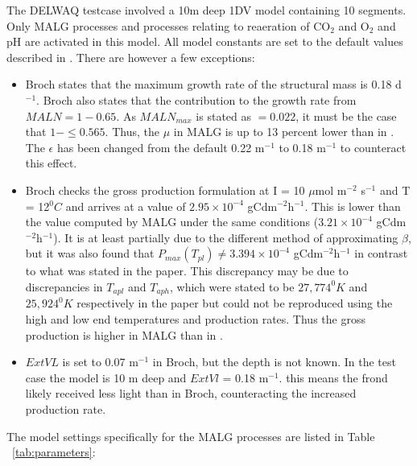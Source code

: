 \documentclass{deltares_manual}
\begin{document}
The DELWAQ testcase involved a 10m deep 1DV model containing 10 segments. Only MALG processes and processes relating to reaeration of CO$_{2}$ and O$_{2}$ and pH are activated in this model. All model constants are set to the default values described in \cite{broch2012}. There are however a few exceptions:
\begin{itemize}
	\item Broch states that the maximum growth rate of the structural mass is 0.18 d$^{-1}$. Broch also states that the contribution to the growth rate from $MALN = 1-0.65$. As $MALN_{max}$ is stated as $= 0.022$, it must be the case that $1- \leq 0.565$. Thus, the $\mu$ in MALG is up to 13 percent lower than in \cite{broch2012}. The $\epsilon$ has been changed from the default 0.22 m$^{-1}$ to 0.18 m$^{-1}$ to counteract this effect.
	\item Broch checks the gross production formulation at I = 10 $\mu$mol m$^{-2}$ s$^{-1}$ and T = 12$^{0}C$ and arrives at a value of $2.95 \times 10^{-4}$ gCdm$^{-2}$h$^{-1}$. This is lower than the value computed by MALG under the same conditions ($3.21  \times 10^{-4}$ gCdm$^{-2}$h$^{-1}$). It is at least partially due to the different method of approximating $\beta$, but it was also found that $P_{max}(T_{pl}) \neq 3.394  \times 10^{-4}$ gCdm$^{-2}$h$^{-1}$ in contrast to what was stated in the paper. This discrepancy may be due to discrepancies in $T_{apl}$ and $T_{aph}$, which were stated to be $27,774^{0}K$ and $25,924^{0}K$ respectively in the paper but could not be reproduced using the high and low end temperatures and production rates. Thus the gross production is higher in MALG than in \cite{broch2012}.
	\item $ExtVL$ is set to 0.07 m$^{-1}$ in Broch, but the depth is not known. In the test case the model is 10 m deep and $ExtVl$ = 0.18 m$^{-1}$. this means the frond likely received less light than in Broch, counteracting the increased production rate.
\end{itemize}

The model settings specifically for the MALG processes are listed in Table ~\ref{tab:parameters}:
\end{document}
